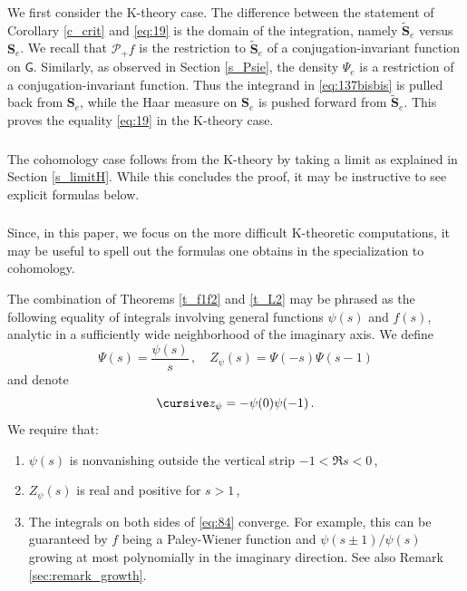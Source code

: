 \documentclass[14pt]{extarticle}
\newcommand{\cz}{\textup{\small \cursive z}}
\newcommand{\bG}{\mathsf{G}}
\newcommand{\cP}{\mathscr{P}}
\newcommand{\bbS}{\mathbf{S}}
\newcommand{\bbSt}{\widetilde{\bbS}}
\theoremstyle{definition}
\begin{document}
We first consider the K-theory case. The difference between
the statement of Corollary
\ref{c_crit} and \eqref{eq:19} is the domain of the integration,
namely $\bbSt_e$ versus $\bbS_e$. We recall that $\cP_+ f$ is
the restriction to $\bbSt_e$ of a conjugation-invariant function
on $\bG$. Similarly, as observed in Section \ref{s_Psie},
the density $\Psi_e$ is a restriction of a conjugation-invariant
function. Thus the integrand in \eqref{eq:137bisbis} is
pulled back from $\bbS_e$, while the Haar measure on $\bbS_e$
is pushed forward from $\bbSt_e$. This proves the equality \eqref{eq:19}
in the K-theory case.

\subsubsection{}

The cohomology case follows from the K-theory by taking
a limit as explained in Section \ref{s_limitH}. While this concludes
the proof, it may be instructive to see explicit formulas below. 

\subsubsection{} \label{s_spell_out}

Since, in this paper, we focus on the more difficult K-theoretic
computations, it may be useful to spell out the formulas one obtains
in the specialization to cohomology. 

The combination of Theorems \ref{t_f1f2} and \ref{t_L2} may be
phrased as the following equality of integrals involving general
functions $\psi(s)$ and $f(s)$, analytic in a sufficiently wide
neighborhood of the imaginary axis. We define 
\[
  \Psi(s) = \frac{\psi(s)}{s} \,, \quad Z_\psi(s) = \Psi(-s) \Psi(s-1) 
\]
and denote
\[
  \cz_\psi = - \psi(0) \psi(-1) \,. 
\]
We require that: 
%
\begin{enumerate}
\item[(1)] $\psi(s)$ is
  nonvanishing outside the vertical strip $-1 < \Re s <0$\,,
\item[(2)] $Z_\psi(s)$ is real and positive for $s>1$\,,
  \item[(3)] The integrals on both sides of \eqref{eq:84}
    converge. For
    example, this can be guaranteed by $f$ being a Paley-Wiener
    function and $\psi(s\pm 1)/\psi(s)$ growing at most polynomially
    in the imaginary direction. See also Remark
    \ref{sec:remark_growth}. 
\end{enumerate}
%
\end{document}
